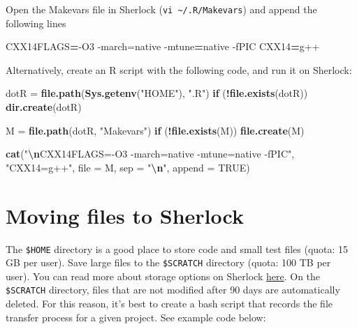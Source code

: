\documentclass[
]{book}
\newenvironment{Shaded}{\begin{snugshade}}{\end{snugshade}}
\newcommand{\AttributeTok}[1]{\textcolor[rgb]{0.13,0.29,0.53}{#1}}
\newcommand{\ConstantTok}[1]{\textcolor[rgb]{0.56,0.35,0.01}{#1}}
\newcommand{\ControlFlowTok}[1]{\textcolor[rgb]{0.13,0.29,0.53}{\textbf{#1}}}
\newcommand{\ExtensionTok}[1]{#1}
\newcommand{\FunctionTok}[1]{\textcolor[rgb]{0.13,0.29,0.53}{\textbf{#1}}}
\newcommand{\NormalTok}[1]{#1}
\newcommand{\OperatorTok}[1]{\textcolor[rgb]{0.81,0.36,0.00}{\textbf{#1}}}
\newcommand{\OtherTok}[1]{\textcolor[rgb]{0.56,0.35,0.01}{#1}}
\newcommand{\SpecialCharTok}[1]{\textcolor[rgb]{0.81,0.36,0.00}{\textbf{#1}}}
\newcommand{\StringTok}[1]{\textcolor[rgb]{0.31,0.60,0.02}{#1}}
\newcommand{\VariableTok}[1]{\textcolor[rgb]{0.00,0.00,0.00}{#1}}
\begin{document}
Open the Makevars file in Sherlock (\texttt{vi\ \textasciitilde{}/.R/Makevars}) and append the following lines

\begin{Shaded}
\begin{Highlighting}[]
\VariableTok{CXX14FLAGS}\OperatorTok{=}\NormalTok{{-}O3 }\ExtensionTok{{-}march=native} \AttributeTok{{-}mtune}\OperatorTok{=}\NormalTok{native }\AttributeTok{{-}fPIC}
\VariableTok{CXX14}\OperatorTok{=}\NormalTok{g++}
\end{Highlighting}
\end{Shaded}

Alternatively, create an R script with the following code, and run it on Sherlock:

\begin{Shaded}
\begin{Highlighting}[]
\NormalTok{dotR }\OtherTok{=} \FunctionTok{file.path}\NormalTok{(}\FunctionTok{Sys.getenv}\NormalTok{(}\StringTok{"HOME"}\NormalTok{), }\StringTok{".R"}\NormalTok{)}
\ControlFlowTok{if}\NormalTok{ (}\SpecialCharTok{!}\FunctionTok{file.exists}\NormalTok{(dotR)) }\FunctionTok{dir.create}\NormalTok{(dotR)}

\NormalTok{M }\OtherTok{=} \FunctionTok{file.path}\NormalTok{(dotR, }\StringTok{"Makevars"}\NormalTok{)}
\ControlFlowTok{if}\NormalTok{ (}\SpecialCharTok{!}\FunctionTok{file.exists}\NormalTok{(M)) }\FunctionTok{file.create}\NormalTok{(M)}

\FunctionTok{cat}\NormalTok{(}\StringTok{"}\SpecialCharTok{\textbackslash{}n}\StringTok{CXX14FLAGS={-}O3 {-}march=native {-}mtune=native {-}fPIC"}\NormalTok{,}
    \StringTok{"CXX14=g++"}\NormalTok{,}
    \AttributeTok{file =}\NormalTok{ M, }\AttributeTok{sep =} \StringTok{"}\SpecialCharTok{\textbackslash{}n}\StringTok{"}\NormalTok{, }\AttributeTok{append =} \ConstantTok{TRUE}\NormalTok{)}
\end{Highlighting}
\end{Shaded}

\section{Moving files to Sherlock}\label{moving-files-to-sherlock}

The \texttt{\$HOME} directory is a good place to store code and small test files (quota: 15 GB per user). Save large files to the \texttt{\$SCRATCH} directory (quota: 100 TB per user). You can read more about storage options on Sherlock \href{https://www.sherlock.stanford.edu/docs/storage/}{here}. On the \texttt{\$SCRATCH} directory, files that are not modified after 90 days are automatically deleted. For this reason, it's best to create a bash script that records the file transfer process for a given project. See example code below:
\end{document}
